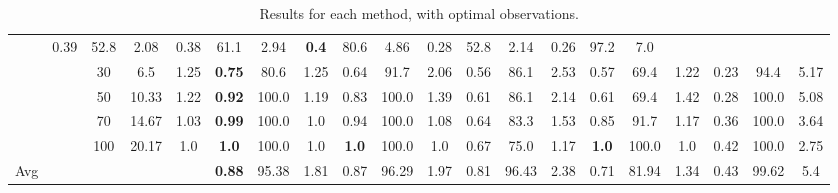\documentclass[letterpaper]{article}
\begin{document}
\begin{table*}[]
\begin{tabular}{|c|c|ccc|ccc|ccc|ccc|ccc|ccc|}
		& 0.39 & 52.8 & 2.08 	 

		& 0.38 & 61.1 & 2.94 	 

		& \textbf{0.4} & 80.6 & 4.86 	 

		& 0.28 & 52.8 & 2.14 	 

		& 0.26 & 97.2 & 7.0 	 

	\\ & & 30	 & 6.5	 & 1.25

		& \textbf{0.75} & 80.6 & 1.25 	 

		& 0.64 & 91.7 & 2.06 	 

		& 0.56 & 86.1 & 2.53 	 

		& 0.57 & 69.4 & 1.22 	 

		& 0.23 & 94.4 & 5.17 	 

	\\ & & 50	 & 10.33	 & 1.22

		& \textbf{0.92} & 100.0 & 1.19 	 

		& 0.83 & 100.0 & 1.39 	 

		& 0.61 & 86.1 & 2.14 	 

		& 0.61 & 69.4 & 1.42 	 

		& 0.28 & 100.0 & 5.08 	 

	\\ & & 70	 & 14.67	 & 1.03

		& \textbf{0.99} & 100.0 & 1.0 	 

		& 0.94 & 100.0 & 1.08 	 

		& 0.64 & 83.3 & 1.53 	 

		& 0.85 & 91.7 & 1.17 	 

		& 0.36 & 100.0 & 3.64 	 

	\\ & & 100	 & 20.17	 & 1.0

		& \textbf{1.0} & 100.0 & 1.0 	 

		& \textbf{1.0} & 100.0 & 1.0 	 

		& 0.67 & 75.0 & 1.17 	 

		& \textbf{1.0} & 100.0 & 1.0 	 

		& 0.42 & 100.0 & 2.75 	 
 \\ \hline
Avg & & & &  & \textbf{0.88} & 95.38 & 1.81 & 0.87 & 96.29 & 1.97 & 0.81 & 96.43 & 2.38 & 0.71 & 81.94 & 1.34 & 0.43 & 99.62 & 5.4
\\ \hline
\end{tabular}
\caption{Results for each method, with optimal observations.}
\end{table*}
\end{document}

